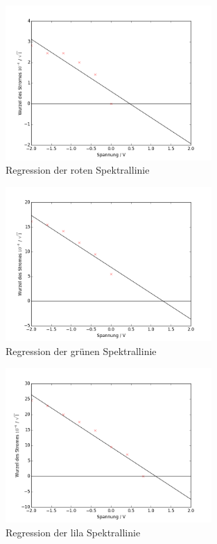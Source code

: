 \begin{figure}[h!]
	\centering
	\includegraphics[width=0.7\textwidth]{build/regression_Farbe:0.png}
	\caption{Regression der roten Spektrallinie}
	\label{fig:regression_rot}
\end{figure}

\begin{figure}[h!]
	\centering
	\includegraphics[width=0.7\textwidth]{build/regression_Farbe:1.png}
	\caption{Regression der grünen Spektrallinie}
	\label{fig:regression_grun}
\end{figure}

\begin{figure}[h!]
	\centering
	\includegraphics[width=0.7\textwidth]{build/regression_Farbe:2.png}
	\caption{Regression der lila Spektrallinie}
	\label{fig:regression_lila}
\end{figure}

